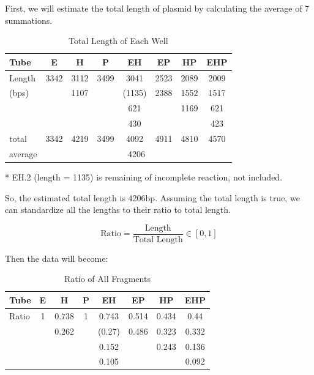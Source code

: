 \documentclass{article}
\begin{document}
            First, we will estimate the total length of plasmid by calculating the average of 7 summations.
            \begin{table}[H]
                \centering
                \caption{Total Length of Each Well}
                \begin{threeparttable}
                    \begin{tabular}{|l|c|c|c|c|c|c|c|}
                        \hline
                        Tube&E&H&P&EH&EP&HP&EHP\\
                        \hline
                        Length&3342&3112&3499&3041&2523&2089&2009\\
                        (bps)&&1107&&(1135)&2388&1552&1517\\
                        &&&&621&&1169&621\\
                        &&&&430&&&423\\
                        \hline
                        total&3342&4219&3499&4092\tnote{*}&4911&4810&4570\\
                        \hline
                        average&\multicolumn{7}{|c|}{4206}\\
                        \hline
                    \end{tabular}
                    \begin{tablenotes}
                        \footnotesize
                        \item[*] EH.2 (length = 1135) is remaining of incomplete reaction, not included.
                    \end{tablenotes}
                \end{threeparttable}
                \label{data.len.table.total}
            \end{table}

            So, the estimated total length is 4206bp. Assuming the total length is true, we can standardize all the lengths to their ratio to total length.

            $$\text{Ratio} = \frac{\text{Length}}{\text{Total Length}} \in [0, 1]$$

            Then the data will become:
            \begin{table}[H]
                \caption{Ratio of All Fragments}
                \centering
                \begin{tabular}{|l|c|c|c|c|c|c|c|}
                    \hline
                    Tube&E&H&P&EH&EP&HP&EHP\\
                    \hline
                    Ratio&1&0.738&1&0.743&0.514&0.434&0.44\\
                    &&0.262&&(0.27)&0.486&0.323&0.332\\
                    &&&&0.152&&0.243&0.136\\
                    &&&&0.105&&&0.092\\
                    \hline
                \end{tabular}
                \label{data.ratio}
            \end{table}
\end{document}
